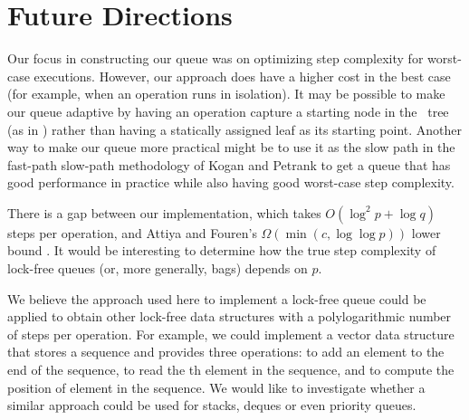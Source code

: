 
\section{Future Directions}

Our focus in constructing our queue was on optimizing step complexity for worst-case executions.
However, our approach does have a higher cost in the best case (for example, when an operation
runs in isolation).
It may be possible to make our queue adaptive by having an operation capture a starting node
in the \ordering\ tree (as in \cite{DBLP:conf/stoc/AfekDT95}) rather than having a statically assigned leaf as its starting point.
Another way to make our queue more practical might be to use it as the slow path in the
fast-path slow-path methodology of Kogan and Petrank \cite{10.1145/2370036.2145835} to
get a queue that has good performance in practice while also having good worst-case step complexity.

There is a gap between our implementation, which takes $O(\log^2 p + \log q)$ steps per operation,
and Attiya and Fouren's $\Omega(\min(c,\log\log p))$ lower bound \cite{DBLP:conf/opodis/AttiyaF17}.
It would be interesting to determine how the true step complexity of lock-free queues (or, more generally, bags)
depends on $p$.

We believe the approach used here to implement a lock-free queue 
could be applied to obtain other lock-free
data structures with a polylogarithmic number of steps per operation.
For example, we could implement a  vector data structure that stores a sequence and
provides three operations:  to add an element  to the end of the sequence,
 to read the th element in the sequence, and
 to compute the position of element  in the sequence.
We would like to investigate whether a similar approach could be used for stacks, deques or even priority queues.


